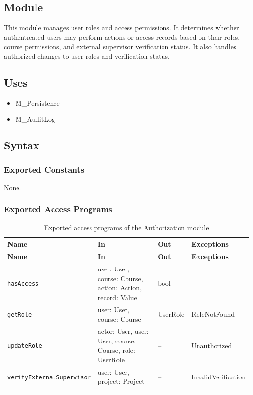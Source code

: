 \documentclass[12pt, titlepage]{article}
\begin{document}
\subsection{Module}

This module manages user roles and access permissions. It determines whether authenticated users may perform actions or access records based on their roles, course permissions, and external supervisor verification status. It also handles authorized changes to user roles and verification status.

\subsection{Uses}

\begin{itemize}
    \item M\_Persistence
    \item M\_AuditLog
\end{itemize}

\subsection{Syntax}

\subsubsection{Exported Constants}
None.

\subsubsection{Exported Access Programs}

\begingroup
\small
\setlength{\tabcolsep}{4pt}
\renewcommand{\arraystretch}{1.2}
\begin{longtable}{>{\raggedright\arraybackslash}p{}
                  >{\raggedright\arraybackslash}p{}
                  >{\raggedright\arraybackslash}p{}
                  >{\raggedright\arraybackslash}p{}}
\toprule
\textbf{Name} & \textbf{In} & \textbf{Out} & \textbf{Exceptions} \\
\midrule
\endfirsthead
\toprule
\textbf{Name} & \textbf{In} & \textbf{Out} & \textbf{Exceptions} \\
\midrule
\endhead
\endfoot
\texttt{hasAccess} & user: User, course: Course, action: Action, record: Value & bool & -- \\
\texttt{getRole} & user: User, course: Course & UserRole & RoleNotFound \\
\texttt{updateRole} & actor: User, user: User, course: Course, role: UserRole & -- & Unauthorized \\
\texttt{verifyExternalSupervisor} & user: User, project: Project & -- & InvalidVerification \\
\bottomrule
\caption{Exported access programs of the Authorization module}
\label{TblAuthorizationAccessPrograms}
\end{longtable}
\endgroup
\end{document}

